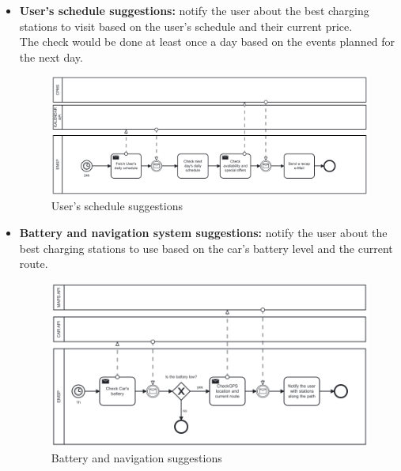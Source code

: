 \documentclass[table, 12pt]{article} %
\begin{document}
        \newpage
        \begin{itemize}                                 
            \item \textbf{User's schedule suggestions:} notify the user about the best charging stations to visit based on the user's schedule and their current price.\\
            The check would be done at least once a day based on the events planned for the next day.
            
            \begin{center}
                \begin{figure}[!h]
                    \includegraphics[scale=0.60, center]{assets/bpmn/suggestion_calendar.png}
                    \caption{User's schedule suggestions}
                    \label{fig: User's schedule suggestions}
                \end{figure}
            \end{center}
        \newpage
            \item \textbf{Battery and navigation system suggestions:} notify the user about the best charging stations to use based on the car's battery level and the current route.\\            
            \begin{center}
                \begin{figure}[!h]
                    \includegraphics[scale=0.60, center]{assets/bpmn/suggestion_battery_nav.png}
                    \caption{Battery and navigation suggestions}
                    \label{fig: Battery and navigation suggestions}
                \end{figure}
            \end{center}
        \end{itemize}
\end{document}
